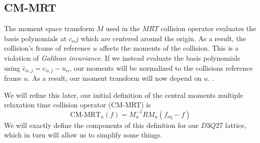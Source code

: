 \subsection{CM-MRT}\label{sec:cm-mrt}
The moment space transform $M$ used in the $MRT$ collision operator
evaluates the basis polynomials at $c_{\alpha}j$
which are centered around the origin.
As a result, the collision's frame of reference $u$ affects the 
moments of the collision.
This is a violation of \textit{Galilean invariance}.
If we instead evaluate the basis polynomials using 
$\bar{c}_{\alpha,j} = c_{\alpha, j} - u_{\alpha}$,
our moments will be normalized to the collisions reference frame $u$. 
As a result, our moment transform will now depend on $u$. \cite{De2017, De2019}.


We will refine this later, our initial definition of 
the central moments multiple relaxation time collision operator (CM-MRT) 
is
$$\label{eqn:cm_mrt_def_init}
\text{CM-MRT}_{u}(f) = M_u^{-1} R  M_u(f_{\text{eq}} - f)
$$
We will exactly define the components of this definition for our
$D3Q27$ lattice, which in turn will allow us to simplify some things.

